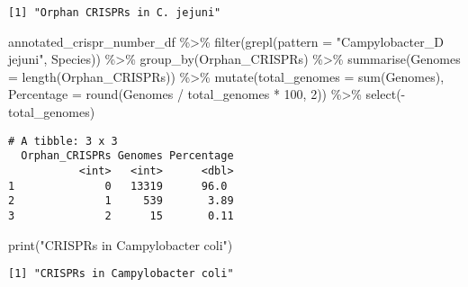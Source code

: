 \documentclass[
  twocolumn,
  landscape]{report}
\newenvironment{Shaded}{}{}
\newcommand{\AttributeTok}[1]{\textcolor[rgb]{0.84,0.23,0.29}{#1}}
\newcommand{\DecValTok}[1]{\textcolor[rgb]{0.00,0.36,0.77}{#1}}
\newcommand{\FunctionTok}[1]{\textcolor[rgb]{0.44,0.26,0.76}{#1}}
\newcommand{\NormalTok}[1]{\textcolor[rgb]{0.14,0.16,0.18}{#1}}
\newcommand{\SpecialCharTok}[1]{\textcolor[rgb]{0.00,0.36,0.77}{#1}}
\newcommand{\StringTok}[1]{\textcolor[rgb]{0.01,0.18,0.38}{#1}}
\begin{document}
\begin{verbatim}
[1] "Orphan CRISPRs in C. jejuni"
\end{verbatim}

\begin{Shaded}
\begin{Highlighting}[]
\NormalTok{annotated\_crispr\_number\_df }\SpecialCharTok{\%\textgreater{}\%}
  \FunctionTok{filter}\NormalTok{(}\FunctionTok{grepl}\NormalTok{(}\AttributeTok{pattern =} \StringTok{"Campylobacter\_D jejuni"}\NormalTok{, Species)) }\SpecialCharTok{\%\textgreater{}\%}
  \FunctionTok{group\_by}\NormalTok{(Orphan\_CRISPRs) }\SpecialCharTok{\%\textgreater{}\%}
  \FunctionTok{summarise}\NormalTok{(}\AttributeTok{Genomes =} \FunctionTok{length}\NormalTok{(Orphan\_CRISPRs)) }\SpecialCharTok{\%\textgreater{}\%}
  \FunctionTok{mutate}\NormalTok{(}\AttributeTok{total\_genomes =} \FunctionTok{sum}\NormalTok{(Genomes),}
         \AttributeTok{Percentage =} \FunctionTok{round}\NormalTok{(Genomes }\SpecialCharTok{/}\NormalTok{ total\_genomes }\SpecialCharTok{*} \DecValTok{100}\NormalTok{, }\DecValTok{2}\NormalTok{)) }\SpecialCharTok{\%\textgreater{}\%}
  \FunctionTok{select}\NormalTok{(}\SpecialCharTok{{-}}\NormalTok{total\_genomes)}
\end{Highlighting}
\end{Shaded}

\begin{verbatim}
# A tibble: 3 x 3
  Orphan_CRISPRs Genomes Percentage
           <int>   <int>      <dbl>
1              0   13319      96.0 
2              1     539       3.89
3              2      15       0.11
\end{verbatim}

\begin{Shaded}
\begin{Highlighting}[]
\FunctionTok{print}\NormalTok{(}\StringTok{"CRISPRs in Campylobacter coli"}\NormalTok{)}
\end{Highlighting}
\end{Shaded}

\begin{verbatim}
[1] "CRISPRs in Campylobacter coli"
\end{verbatim}
\end{document}
